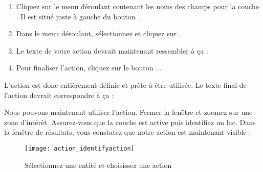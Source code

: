 \begin{enumerate}
\item Cliquez sur le menu déroulant contenant les noms des champs pour la couche . Il est situé juste à gauche du bouton .
\item Dans le menu déroulant, sélectionnez  et cliquez sur .
\item Le texte de votre action devrait maintenant ressembler à ça :\\
\item Pour finaliser l'action, cliquez sur le bouton ...
\end{enumerate}

L'action est donc entièrement définie et prête à être utilisée. Le texte final de l'action devrait correspondre à ça :

\begin{center}
\end{center}

Nous pouvons maintenant utiliser l'action. Fermer la fenêtre  et zoomez sur une zone d'intérêt. Assurez-vous que la couche  est active puis identifiez un lac. Dans la fenêtre de résultats, vous constatez que notre action est maintenant visible :

\begin{figure}[H]
  \begin{center}
  \caption{Sélectionnez une entité et choisissez une action \nixcaption}\label{fig:identify_action}\smallskip
  \texttt{[image: action\_identifyaction]}
\end{center}
\end{figure}

